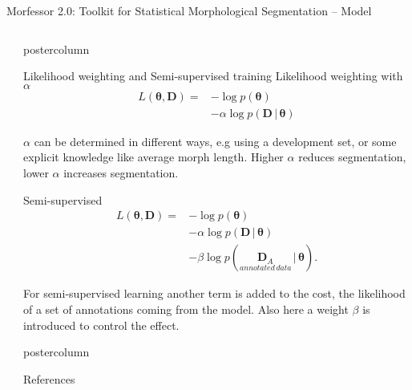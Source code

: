 \documentclass[final]{beamer} %
\newcommand{\seq}[1]{\boldsymbol{#1}}
\newcommand{\cost}{L}
\newcommand{\params}{\boldsymbol{\theta}}
\newcommand{\data}{\seq{D}}
\newcommand{\vb}{\,|\,}
\begin{document}
\begin{frame}{Morfessor 2.0: Toolkit for Statistical Morphological Segmentation -- Model}
\begin{columns}
\begin{column}{.4\textwidth}
\end{column}
\begin{column}{.3\textwidth}




      \begin{beamercolorbox}[center,wd=\textwidth]{postercolumn}
 \begin{block}{Likelihood weighting and Semi-supervised training }
Likelihood weighting with $\alpha$ \citep{virpioja2011nodalida}
\begin{align*}
  \cost(\params, \data) =& - \log p(\params) \\&- \alpha \log p(\data
  \vb \params)
\end{align*}

$\alpha$ can be determined in different ways, e.g using a development set, or some explicit knowledge like average morph length. Higher $\alpha$ reduces segmentation, lower $\alpha$ increases segmentation.

Semi-supervised \citep{kohonen2010sigmorphon}
\begin{align*}
  \cost(\params, \data) = & - \log p(\params) \\&- \alpha \log p(\data
  \vb \params) \\&- \beta \log p(\underset{annotated\,data}{\data_{A}} \vb \params).
\end{align*}

For semi-supervised learning another term is added to the cost, the likelihood of a set of annotations coming from the model. Also here a weight $\beta$ is introduced to control the effect.

            \end{block}
	\end{beamercolorbox}


  \begin{beamercolorbox}[center,wd=\textwidth]{postercolumn}
 \begin{block}{References}
\footnotesize

           
            \end{block}
            
	\end{beamercolorbox}




\end{column}

\end{columns}
 \end{frame}



  
\end{document}
